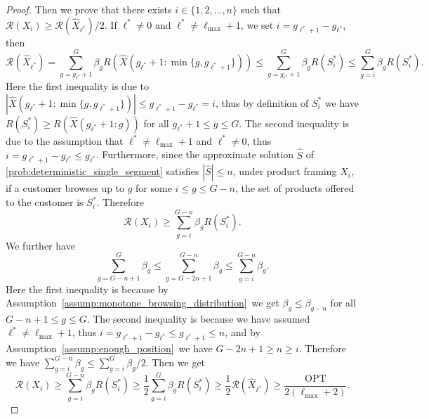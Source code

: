 \documentclass[10pt,a4paper]{amsart}
\begin{document}
\begin{proof}
Then we prove that there exists $i\in\{1,2,\dots,n\}$ such that $\mathcal{R}(X_i)\geq \mathcal{R}(\hat{X}_{\ell^*})/2$. If $\ell^*\neq 0$ and $\ell^*\neq \ell_{\max}+1$, we set $i=g_{\ell^*+1}-g_{\ell^*}$, then
\begin{equation*}
\mathcal{R}(\hat{X}_{\ell^*})=\sum_{g=g_{\ell^*}+1}^{G}\beta_g R(\hat{X}(g_{\ell^*}+1:\min\{g,g_{\ell^*+1}\}))\leq \sum_{g=g_{\ell^*}+1}^{G}\beta_g R(S_i^*)\leq \sum_{g=i}^G\beta_gR(S_i^*).
\end{equation*}
Here the first inequality is due to $|\hat{X}(g_{\ell^*}+1:\min\{g,g_{\ell^*+1}\})|\leq g_{\ell^*+1}-g_{\ell^*}=i$, thus by definition of $S_i^*$ we have $R(S_i^*)\geq R(\hat{X}(g_{\ell^*}+1:g))$ for all $g_{\ell^*}+1\leq g\leq G$. The second inequality is due to the assumption that $\ell^*\neq \ell_{\max}+1$ and $\ell^*\neq 0$, thus $i=g_{\ell^*+1}-g_{\ell^*}\leq g_{\ell^*}$. Furthermore, since the approximate solution $\hat{S}$ of \eqref{prob:deterministic_single_segment} satisfies $|\hat{S}|\leq n$, under product framing $X_i$, if a customer browses up to $g$ for some $i\leq g\leq G-n$, the set of products offered to the customer is $S_i^*$. Therefore
\begin{equation*}
\mathcal{R}(X_i)\geq \sum_{g=i}^{G-n}\beta_g R(S_i^*).
\end{equation*}
We further have
\begin{equation*}
\sum_{g=G-n+1}^G \beta_g\leq \sum_{g=G-2n+1}^{G-n}\beta_g\leq \sum_{g=i}^{G-n}\beta_g.
\end{equation*}
Here the first inequality is because by Assumption~\ref{assump:monotone_browsing_distribution}~we get $\beta_g\leq \beta_{g-n}$ for all $G-n+1\leq g\leq G$. The second inequality is because we have assumed $\ell^*\neq \ell_{\max}+1$, thus $i=g_{\ell^*+1}-g_{\ell^*}\leq g_{\ell^*+1}\leq n$, and by Assumption~\ref{assump:enough_position}~we have $G-2n+1\geq n\geq i$. Therefore we have $\sum_{g=i}^{G-n}\beta_g\leq \sum_{g=i}^G\beta_g/2$. Then we get
\begin{equation*}
\mathcal{R}(X_i)\geq \sum_{g=i}^{G-n}\beta_g R(S_i^*)\geq \dfrac{1}{2}\sum_{g=i}^G \beta_gR(S_i^*)\geq \dfrac{1}{2}\mathcal{R}(\hat{X}_{\ell^*})\geq \dfrac{\text{OPT}}{2(\ell_{\max}+2)}.
\end{equation*}


\end{proof}
\end{document}
